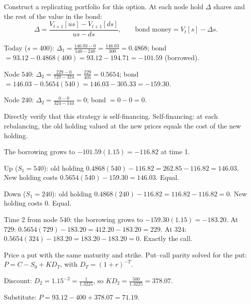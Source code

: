 \begin{problem}[Q4(ii)]
Construct a replicating portfolio for this option.
\cardsays At each node hold $\Delta$ shares and the rest of the value in the bond:
\[
\Delta=\frac{V_{t+1}[us]-V_{t+1}[ds]}{us-ds},\qquad\text{bond money}=V_t[s]-\Delta s.
\]
\working
\begin{steps}
\item Today ($s=400$): $\Delta_1=\frac{146.03-0}{540-240}=\frac{146.03}{300}=0.4868$; bond $=93.12-0.4868(400)=93.12-194.71=-101.59$ (borrowed).
\item Node $540$: $\Delta_2=\frac{229-0}{729-324}=\frac{229}{405}=0.5654$; bond $=146.03-0.5654(540)=146.03-305.33=-159.30$.
\item Node $240$: $\Delta_2=\frac{0-0}{324-144}=0$; bond $=0-0=0$.
\end{steps}
\end{problem}

\begin{problem}[Q4(iii)]
Directly verify that this strategy is self-financing.
\cardsays Self-financing: at each rebalancing, the old holding valued at the new prices equals the cost of the new holding.
\working
\begin{steps}
\item The borrowing grows to $-101.59(1.15)=-116.82$ at time 1.
\item Up ($S_1=540$): old holding $0.4868(540)-116.82=262.85-116.82=146.03$. New holding costs $0.5654(540)-159.30=146.03$. Equal.
\item Down ($S_1=240$): old holding $0.4868(240)-116.82=116.82-116.82=0$. New holding costs $0$. Equal.
\item Time 2 from node $540$: the borrowing grows to $-159.30(1.15)=-183.20$. At $729$: $0.5654(729)-183.20=412.20-183.20=229$. At $324$: $0.5654(324)-183.20=183.20-183.20=0$. Exactly the call.
\end{steps}
\end{problem}

\begin{problem}[Q4(iv)]
Price a put with the same maturity and strike.
\cardsays Put--call parity solved for the put: $P=C-S_0+KD_T$, with $D_T=(1+r)^{-T}$.
\working
\begin{steps}
\item Discount: $D_2=1.15^{-2}=\frac1{1.3225}$, so $KD_2=\frac{500}{1.3225}=378.07$.
\item Substitute: $P=93.12-400+378.07=71.19$.
\end{steps}
\end{problem}

